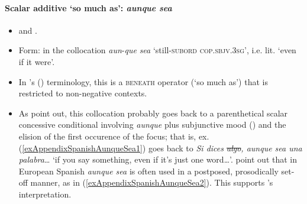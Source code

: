 \paragraph{Scalar additive \lq so much as': \textit{aunque sea}}
\label{appendixSpanishAunqueSea}
\begin{itemize}
	\item \textcite{GastvanderAuwera2011} and \textcite[§47.12q]{RAEGramatica}.
	\item Form: in the collocation \textit{aun}-\textit{que} \textit{sea} \lq still-\textsc{subord} \textsc{cop}.\textsc{sbjv}.3\textsc{sg}', i.e. lit. \lq even if it were\rq{}.
	\item In \citeauthor{GastvanderAuwera2011}'s (\citeyear{GastvanderAuwera2011}) terminology, this is a \textsc{beneath} operator (\lq so much as\rq{}) that is restricted to non-negative contexts.
		\item As \textcite{GastvanderAuwera2011} point out, this collocation probably goes back to a parenthetical scalar concessive conditional involving \textit{aunque} plus subjunctive mood () and the elision of the first occurence of the focus; that is, ex. (\ref{exAppendixSpanishAunqueSea1}) goes back to \textit{Si dices \sout{algo}, aunque sea una palabra}… \lq if you say something, even if it's just one word…'. \textcite[§47.12q]{RAEGramatica} point out that in European Spanish \textit{aunque sea} is often used in a postposed, prosodically set-off manner, as in (\ref{exAppendixSpanishAunqueSea2}). This supports \citeauthor{GastvanderAuwera2011}'s interpretation.
\end{itemize}

